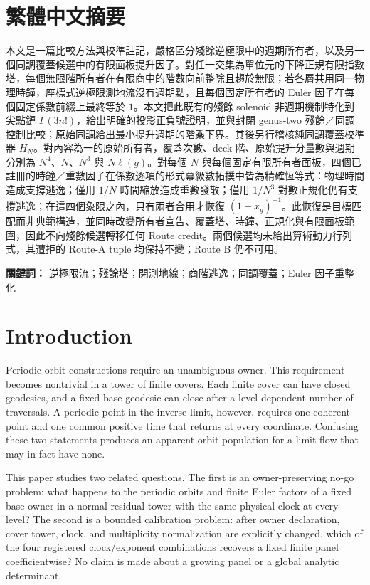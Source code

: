 \documentclass[11pt]{article}
\theoremstyle{definition}
\theoremstyle{remark}
\begin{document}
\section*{繁體中文摘要}
本文是一篇比較方法與校準註記，嚴格區分殘餘逆極限中的週期所有者，以及另一個同調覆蓋候選中的有限面板提升因子。對任一交集為單位元的下降正規有限指數塔，每個無限階所有者在有限商中的階數向前整除且趨於無限；若各層共用同一物理時鐘，座標式逆極限測地流沒有週期點，且每個固定所有者的 Euler 因子在每個固定係數前綴上最終等於 $1$。本文把此既有的殘餘 solenoid 非週期機制特化到尖點鏈 $\Gamma(3n!)$，給出明確的投影正負號證明，並與封閉 genus-two 殘餘／同調控制比較；原始同調給出最小提升週期的階乘下界。其後另行稽核純同調覆蓋校準器 $H_N$。對內容為一的原始所有者，覆蓋次數、deck 階、原始提升分量數與週期分別為 $N^4$、$N$、$N^3$ 與 $N\ell(g)$。對每個 $N$ 與每個固定有限所有者面板，四個已註冊的時鐘／重數因子在係數逐項的形式冪級數拓撲中皆為精確恆等式：物理時間造成支撐逃逸；僅用 $1/N$ 時間縮放造成重數發散；僅用 $1/N^3$ 對數正規化仍有支撐逃逸；在這四個象限之內，只有兩者合用才恢復 $(1-x_g)^{-1}$。此恢復是目標匹配而非典範構造，並同時改變所有者宣告、覆蓋塔、時鐘、正規化與有限面板範圍，因此不向殘餘候選轉移任何 Route credit。兩個候選均未給出算術動力行列式，其遭拒的 Route-A tuple 均保持不變；Route B 仍不可用。

\medskip
\noindent\textbf{關鍵詞：} 逆極限流；殘餘塔；閉測地線；商階逃逸；同調覆蓋；Euler 因子重整化

\section{Introduction}

Periodic-orbit constructions require an unambiguous owner. This requirement becomes nontrivial in a tower of finite covers. Each finite cover can have closed geodesics, and a fixed base geodesic can close after a level-dependent number of traversals. A periodic point in the inverse limit, however, requires one coherent point and one common positive time that returns at every coordinate. Confusing these two statements produces an apparent orbit population for a limit flow that may in fact have none.

This paper studies two related questions. The first is an owner-preserving no-go problem: what happens to the periodic orbits and finite Euler factors of a fixed base owner in a normal residual tower with the same physical clock at every level? The second is a bounded calibration problem: after owner declaration, cover tower, clock, and multiplicity normalization are explicitly changed, which of the four registered clock/exponent combinations recovers a fixed finite panel coefficientwise? No claim is made about a growing panel or a global analytic determinant.
\end{document}
